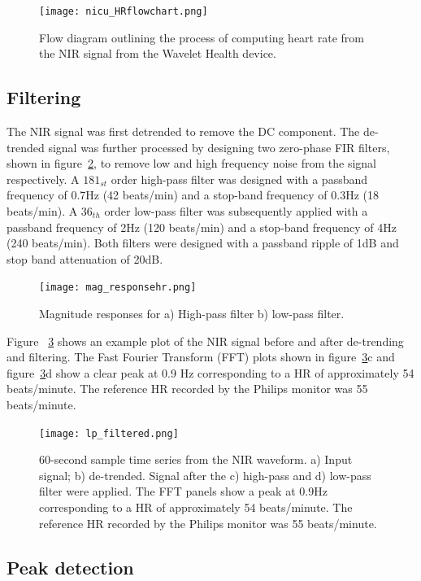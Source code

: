 \begin{figure}
    \centering
\texttt{[image: nicu\_HRflowchart.png]}
    \caption{Flow diagram outlining the process of computing heart rate from the NIR signal from the Wavelet Health device.}
    \label{HRoverview} 
\end{figure}

\subsection{Filtering}

The NIR signal was first detrended to remove the DC component. The de-trended signal was further processed by designing two zero-phase FIR filters, shown in figure~\ref{mag_HR}, to remove low and high frequency noise from the signal respectively. A $181_{st}$ order high-pass filter was designed with a passband frequency of  0.7Hz (42 beats/min) and a stop-band frequency of 0.3Hz (18 beats/min). A $36_{th}$ order low-pass filter was subsequently applied with a passband frequency of 2Hz (120 beats/min) and a stop-band frequency of 4Hz (240 beats/min). Both filters were designed with a passband ripple of 1dB and stop band attenuation of 20dB.
 

\begin{figure}
\centering
\texttt{[image: mag\_responsehr.png]}
    \caption[Magnitude responses.]{Magnitude responses for a) High-pass filter b) low-pass filter.}
        \label{mag_HR}
\end{figure}

Figure ~\ref{figfilt} shows an example plot of the NIR signal before and after de-trending and filtering. The Fast Fourier Transform (FFT) plots shown in figure~\ref{figfilt}c and figure~\ref{figfilt}d show a clear peak at 0.9 Hz corresponding to a HR of approximately 54 beats/minute. The reference HR recorded by the Philips monitor was 55 beats/minute.


\begin{figure}
\centering
\texttt{[image: lp\_filtered.png]}
    \caption[60-second sample time series from the NIR waveform.]{60-second sample time series from the NIR waveform. a) Input signal; b) de-trended. Signal after the c) high-pass and d) low-pass filter were applied. The FFT panels show a peak at 0.9Hz corresponding to a HR of approximately 54 beats/minute. The reference HR recorded by the Philips monitor was 55 beats/minute.}
    \label{figfilt}
\end{figure}

\subsection{Peak detection}
\label{peak_eqn}

